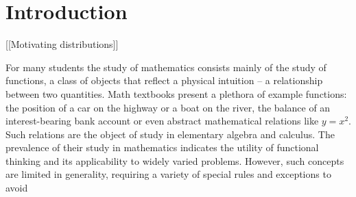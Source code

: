 \chapter*{Introduction}

  [[Motivating distributions]]

  For many students the study of mathematics consists mainly of the study of functions, a class of objects that reflect a physical intuition -- a relationship between two quantities.
  Math textbooks present a plethora of example functions: the position of a car on the highway or a boat on the river, the balance of an interest-bearing bank account or even abstract mathematical relations like $y=x^2$.
  Such relations are the object of study in elementary algebra and calculus. 
  The prevalence of their study in mathematics indicates the utility of functional thinking and its applicability to widely varied problems.
  However, such concepts are limited in generality, requiring a variety of special rules and exceptions to avoid 
